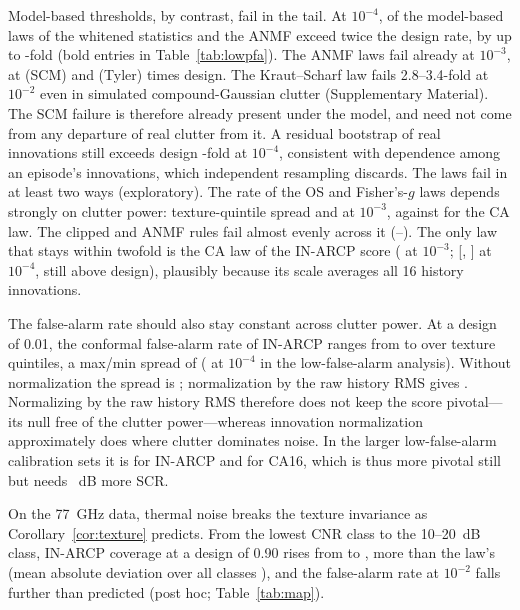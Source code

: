 \documentclass[journal]{IEEEtran}
\begin{document}
Model-based thresholds, by contrast, fail in the tail. At $10^{-4}$, \NWhitenedLawsFail{} of the \NWhitenedLaws{} model-based laws of the whitened statistics and the ANMF exceed twice the design rate, by up to \LAnalMaxFour-fold (bold entries in Table~\ref{tab:lowpfa}). The ANMF laws fail already at $10^{-3}$, at \LScmThree{} (SCM) and \LFpThree{} (Tyler) times design. The Kraut--Scharf law fails 2.8--3.4-fold at $10^{-2}$ even in simulated compound-Gaussian clutter (Supplementary Material). The SCM failure is therefore already present under the model, and need not come from any departure of real clutter from it. A residual bootstrap of real innovations still exceeds design \LBootFour-fold at $10^{-4}$, consistent with dependence among an episode's innovations, which independent resampling discards. The laws fail in at least two ways (exploratory). The rate of the OS and Fisher's-$g$ laws depends strongly on clutter power: texture-quintile spread \AnalSpreadOsThree{} and \AnalSpreadFisherThree{} at $10^{-3}$, against \AnalSpreadInThree{} for the CA law. The clipped and ANMF rules fail almost evenly across it (\AnalSpreadClipThree--\AnalSpreadFpThree). The only law that stays within twofold is the CA law of the IN-ARCP score (\LInAnalThree{} at $10^{-3}$; \LInAnalFour{} [\InAnalFourLo, \InAnalFourHi] at $10^{-4}$, still above design), plausibly because its scale averages all 16 history innovations.

The false-alarm rate should also stay constant across clutter power. At a design of 0.01, the conformal false-alarm rate of IN-ARCP ranges from \QPfaINMin{} to \QPfaINMax{} over texture quintiles, a max/min spread of \QPfaINSpread{} (\LInConfSpreadFour{} at $10^{-4}$ in the low-false-alarm analysis). Without normalization the spread is \QPfaUSpread; normalization by the raw history RMS gives \QPfaRMSSpread. Normalizing by the raw history RMS therefore does not keep the score pivotal---its null free of the clutter power---whereas innovation normalization approximately does where clutter dominates noise. In the larger low-false-alarm calibration sets it is \NetSpreadInIpix{} for IN-ARCP and \NetSpreadCaIpix{} for CA16, which is thus more pivotal still but needs \DetINGainCAHalf~dB more SCR.

On the 77~GHz data, thermal noise breaks the texture invariance as Corollary~\ref{cor:texture} predicts. From the lowest CNR class to the 10--20~dB class, IN-ARCP coverage at a design of 0.90 rises from \JInLow{} to \JInHigh{}, more than the law's \JPredHigh{} (mean absolute deviation over all classes \JMae), and the false-alarm rate at $10^{-2}$ falls further than predicted (post hoc; Table~\ref{tab:map}).
\end{document}
